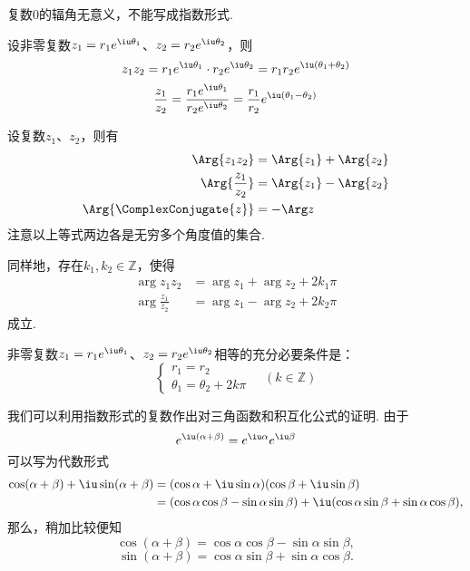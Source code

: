 复数0的辐角无意义，不能写成指数形式.

\begin{theorem}[指数形式下的复数的乘除法]
设非零复数\(z_1 = r_1 e^{\iu\theta_1}\)、\(z_2 = r_2 e^{\iu\theta_2}\)，则\begin{equation*}
z_1 z_2 = r_1 e^{\iu\theta_1} \cdot r_2 e^{\iu\theta_2} = r_1 r_2 e^{\iu(\theta_1+\theta_2)}
\end{equation*}\begin{equation*}
\frac{z_1}{z_2} = \frac{r_1 e^{\iu\theta_1}}{r_2 e^{\iu\theta_2}} = \frac{r_1}{r_2} e^{\iu(\theta_1-\theta_2)}
\end{equation*}
\end{theorem}

\begin{property}
设复数\(z_1\)、\(z_2\)，则有\begin{align*}
\Arg{z_1 z_2} &= \Arg{z_1} + \Arg{z_2} \\
\Arg{\frac{z_1}{z_2}} &= \Arg{z_1} - \Arg{z_2} \\
\Arg{\ComplexConjugate{z}} &= -\Arg z
\end{align*}
注意以上等式两边各是无穷多个角度值的集合.

同样地，存在\(k_1,k_2 \in \mathbb{Z}\)，使得\begin{align*}
\arg{z_1 z_2} &= \arg{z_1} + \arg{z_2} + 2 k_1 \pi \\
\arg{\frac{z_1}{z_2}} &= \arg{z_1} - \arg{z_2} + 2 k_2 \pi
\end{align*}
成立.
\end{property}

\begin{theorem}[指数形式下复数相等条件]
非零复数\(z_1=r_1 e^{\iu\theta_1}\)、\(z_2=r_2 e^{\iu\theta_2}\)相等的充分必要条件是：\begin{equation*}
\left\{ \begin{array}{l}
r_1 = r_2 \\
\theta_1 = \theta_2 + 2k\pi
\end{array} \right. \quad (k \in \mathbb{Z})
\end{equation*}
\end{theorem}

我们可以利用指数形式的复数作出对三角函数和积互化公式的证明.
由于\begin{equation*}
e^{\iu(\alpha+\beta)}
= e^{\iu\alpha} e^{\iu\beta}
\end{equation*}
可以写为代数形式
\begin{equation*}\begin{aligned}
\cos(\alpha+\beta)+\iu\sin(\alpha+\beta)
&= (\cos\alpha+\iu\sin\alpha)(\cos\beta+\iu\sin\beta) \\
&= (\cos\alpha \cos\beta - \sin\alpha \sin\beta)
    + \iu(\cos\alpha \sin\beta + \sin\alpha \cos\beta),
\end{aligned}\end{equation*}
那么，稍加比较便知\begin{equation*}
\cos(\alpha+\beta) = \cos\alpha \cos\beta - \sin\alpha \sin\beta,
\end{equation*}\begin{equation*}
\sin(\alpha+\beta) = \cos\alpha \sin\beta + \sin\alpha \cos\beta.
\end{equation*}

